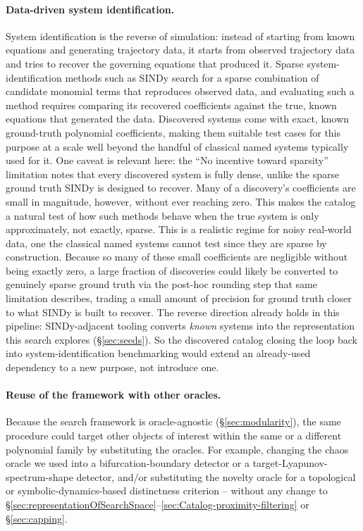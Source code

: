 \documentclass[11pt]{article}
\begin{document}
\paragraph{Data-driven system identification.} System identification is the
reverse of simulation: instead of starting from known equations and
generating trajectory data, it starts from observed trajectory data and
tries to recover the governing equations that produced it. Sparse
system-identification methods such as SINDy \citep{brunton2016discovering}
search for a sparse combination of candidate monomial terms that
reproduces observed data, and evaluating such a method requires comparing
its recovered coefficients against the true, known equations that
generated the data. Discovered systems come with exact, known ground-truth
polynomial coefficients, making them suitable test cases for this purpose
at a scale well beyond the handful of classical named systems typically
used for it. One caveat is relevant here: the ``No incentive toward
sparsity'' limitation notes that every
discovered system is fully dense, unlike the sparse ground truth SINDy is
designed to recover. Many of a discovery's coefficients are small in
magnitude, however, without ever reaching zero. This makes the catalog a natural test of how such methods
behave when the true system is only approximately, not exactly, sparse.
This is a realistic regime for noisy real-world data, one the classical
named systems cannot test since they are sparse by construction. Because
so many of these small coefficients are negligible without being exactly
zero, a large fraction of discoveries could likely be converted to
genuinely sparse ground truth via the post-hoc rounding step that same
limitation describes, trading a small amount of precision for
ground truth closer to what SINDy is built to recover. The reverse
direction already holds in this pipeline: SINDy-adjacent tooling
\citep{stevenshaas2024genexperiments} converts \emph{known} systems into the
representation this search explores (\S\ref{sec:seeds}). So the discovered
catalog closing the loop back into system-identification benchmarking would
extend an already-used dependency to a new purpose, not introduce one.

\paragraph{Reuse of the framework with other oracles.} Because the search
framework is oracle-agnostic (\S\ref{sec:modularity}), the same procedure could
target other objects of interest within the same or a different polynomial
family by substituting the oracles. For example, changing the chaos oracle we used into a bifurcation-boundary
detector or a target-Lyapunov-spectrum-shape detector, and/or substituting
the novelty oracle for a topological or symbolic-dynamics-based distinctness
criterion -- without any change to \S\ref{sec:representationOfSearchSpace}--\ref{sec:Catalog-proximity-filtering} or \S\ref{sec:capping}.
\end{document}
